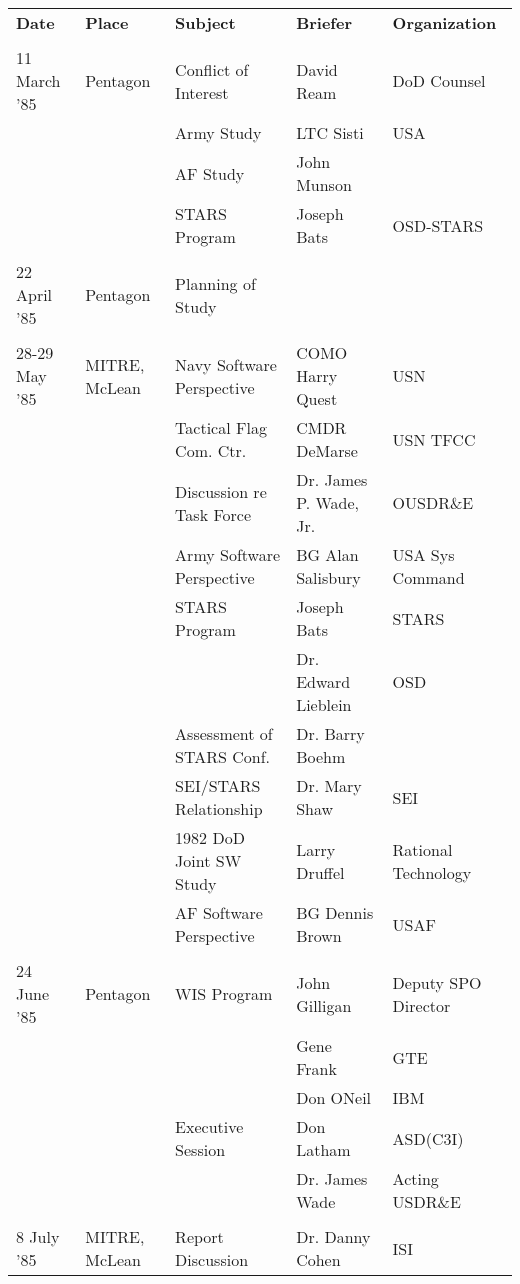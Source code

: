 \documentclass[12pt,final]{article}
\begin{document}
\noindent
\begin{footnotesize}
\begin{tabular}{ l l l l l }
\textbf{Date} & \textbf{Place} & \textbf{Subject} & \textbf{Briefer} & \textbf{Organization}\\
\\
11 March ’85 & Pentagon & Conflict of Interest & David Ream & DoD Counsel\\
    & & Army Study    & LTC Sisti & USA \\
    & & AF Study      & John Munson & \\
    & & STARS Program & Joseph Bats & OSD-STARS \\
\\
    22 April ’85 & Pentagon & Planning of Study\\
\\
    28-29 May ’85 & MITRE, McLean & Navy Software Perspective         & COMO Harry Quest & USN\\
    & & Tactical Flag Com. Ctr.      & CMDR DeMarse     & USN TFCC\\
    & & Discussion re Task Force     & Dr. James P. Wade, Jr. &  OUSDR\&E\\
    & & Army Software Perspective    & BG Alan Salisbury     & USA Sys Command\\
    & & STARS Program                & Joseph Bats           & STARS\\
    & &                              & Dr. Edward Lieblein   & OSD\\
    & & Assessment of STARS Conf.    & Dr. Barry Boehm & \\
    & & SEI/STARS Relationship       & Dr. Mary Shaw& SEI \\
    & & 1982 DoD Joint SW Study      & Larry Druffel & Rational Technology\\
    & & AF Software Perspective      & BG Dennis Brown & USAF\\
\\
    24 June ’85 & Pentagon  & WIS Program & John Gilligan     & Deputy SPO Director\\
 & & & Gene Frank                    & GTE\\
 & & & Don ONeil                     & IBM\\
 & & Executive Session & Don Latham  & ASD(C3I)\\
 & & & Dr. James Wade                & Acting USDR\&E\\
\\
8 July ’85 & MITRE, McLean & Report Discussion & Dr. Danny Cohen & ISI\\

\end{tabular}
\end{footnotesize}
\end{document}
